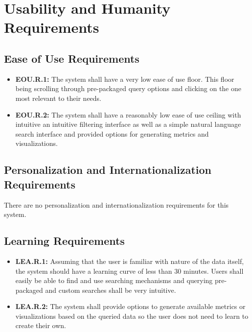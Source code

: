 \documentclass[12pt]{article}
\begin{document}
\section{Usability and Humanity Requirements}



\subsection{Ease of Use Requirements}

\begin{itemize}
    \item \textbf{EOU.R.1:}\label{req:eou.r.1} The system shall have a very low ease of use floor. This floor being scrolling through
    pre-packaged query options and clicking on the one most relevant to their needs.
    \item \textbf{EOU.R.2:}\label{req:eou.r.2} The system shall have a reasonably low ease of use ceiling with intuitive an intuitive filtering interface
    as well as a simple natural language search interface and provided options for generating metrics and visualizations.
\end{itemize}

\subsection{Personalization and Internationalization Requirements}

\par{There are no personalization and internationalization requirements for this system.}



\subsection{Learning Requirements}

\begin{itemize}
    \item \textbf{LEA.R.1:}\label{req:lea.r.1} Assuming that the user is familiar with nature of the data itself, the system should
    have a learning curve of less than 30 minutes. Users shall easily be able to find and use searching
    mechanisms and querying pre-packaged and custom searches shall be very intuitive.
    \item \textbf{LEA.R.2:}\label{req:lea.r.2} The system shall provide options to generate available metrics or visualizations based on the queried
    data so the user does not need to learn to create their own.
\end{itemize}
\end{document}
